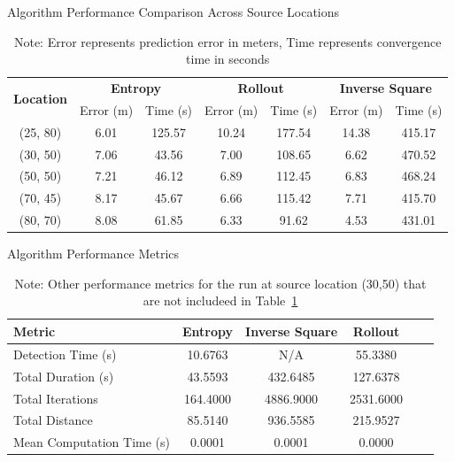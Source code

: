 \documentclass[../report.tex]{subfiles}
\begin{document}
    \begin{table}[htbp]
        \centering
        \caption{Algorithm Performance Comparison Across Source Locations}
        \label{tab:algorithm_comparison}
        \setlength{\tabcolsep}{4pt}  %
        \begin{tabular}{|c|cc|cc|cc|}
                \hline
                \multirow{2}{*}{\textbf{Location}} & \multicolumn{2}{c|}{\textbf{Entropy}} & \multicolumn{2}{c|}{\textbf{Rollout}} & \multicolumn{2}{c|}{\textbf{Inverse Square}} \\
                \cline{2-7}
                & Error (m) & Time (s) & Error (m) & Time (s) & Error (m) & Time (s) \\
                \hline
                (25, 80) & 6.01 & 125.57 & 10.24 & 177.54 & 14.38 & 415.17 \\
                \rowcolor{gray!20}
                (30, 50) & 7.06 & 43.56 & 7.00 & 108.65 & 6.62 & 470.52 \\
                (50, 50) & 7.21 & 46.12 & 6.89 & 112.45 & 6.83 & 468.24 \\
                (70, 45) & 8.17 & 45.67 & 6.66 & 115.42 & 7.71 & 415.70 \\
                (80, 70) & 8.08 & 61.85 & 6.33 & 91.62 & 4.53 & 431.01 \\
                \hline
            \end{tabular}
            \caption*{Note: Error represents prediction error in meters, Time represents convergence time in seconds}
    \end{table}

    \begin{table}[!htbp]
        \caption{Algorithm Performance Metrics}
        \label{tab:algorithm_performance}
        \begin{tabular}{|l |c |c |c |c |c|}
        \hline
        \cellcolor{gray!10!white} Metric & Entropy & Inverse Square & Rollout \\
        \hline
        Detection Time (s) & 10.6763 & N/A & 55.3380 \\
        Total Duration (s) & 43.5593 & 432.6485 & 127.6378 \\
        Total Iterations & 164.4000 & 4886.9000 & 2531.6000 \\
        Total Distance & 85.5140 & 936.5585 & 215.9527 \\
        Mean Computation Time (s) & 0.0001 & 0.0001 & 0.0000 \\
        \hline
        \end{tabular}
        \caption*{Note: Other performance metrics for the run at source location (30,50) that are not includeed in Table~\ref{tab:algorithm_comparison}}
     \end{table}
\end{document}
